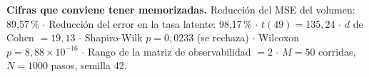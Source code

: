\documentclass[11pt,letterpaper,oneside]{article}
\begin{document}
\vspace{1.2em}
\begin{mdframed}[backgroundcolor=fondo,linewidth=0pt,innertopmargin=8pt,
                 innerbottommargin=8pt,innerleftmargin=10pt,innerrightmargin=10pt]
\small
\textbf{Cifras que conviene tener memorizadas.}\quad
Reducción del MSE del volumen: 89,57\,\% \quad$\cdot$\quad
Reducción del error en la tasa latente: 98,17\,\% \quad$\cdot$\quad
$t(49) = 135{,}24$ \quad$\cdot$\quad
$d$ de Cohen $= 19{,}13$ \quad$\cdot$\quad
Shapiro-Wilk $p = 0{,}0233$ (se rechaza) \quad$\cdot$\quad
Wilcoxon $p = 8{,}88\times10^{-16}$ \quad$\cdot$\quad
Rango de la matriz de observabilidad $= 2$ \quad$\cdot$\quad
$M = 50$ corridas, $N = 1000$ pasos, semilla 42.
\end{mdframed}
\end{document}
